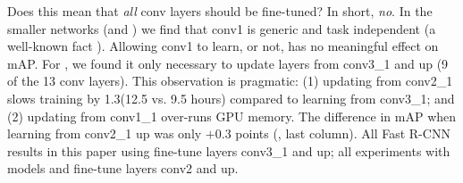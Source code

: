 Does this mean that \emph{all} conv layers should be fine-tuned? In short, \emph{no}.
In the smaller networks (\Sm and \Med) we find that conv1 is generic and task independent (a well-known fact \cite{krizhevsky2012imagenet}).
Allowing conv1 to learn, or not, has no meaningful effect on mAP.
For \vggsixteen, we found it only necessary to update layers from conv3\_1 and up (9 of the 13 conv layers).
This observation is pragmatic: (1) updating from conv2\_1 slows training by 1.3\X (12.5 vs. 9.5 hours) compared to learning from conv3\_1;
and (2) updating from conv1\_1 over-runs GPU memory.
The difference in mAP when learning from conv2\_1 up was only $+0.3$ points (, last column).
All Fast R-CNN results in this paper using \vggsixteen fine-tune layers conv3\_1 and up; all experiments with models \Sm and \Med fine-tune layers conv2 and up.
